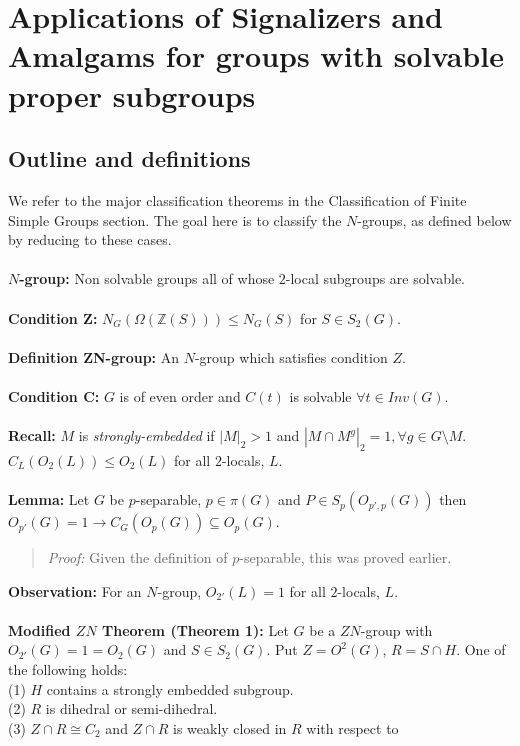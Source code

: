 \chapter{Applications of Signalizers and Amalgams for groups with solvable proper subgroups}
\section {Outline and definitions}
We refer to the major classification theorems in the Classiﬁcation of Finite Simple Groups section.  The
goal here is to classify the $N$-groups, as defined below by reducing to these cases.
\\
\\
{\bf $N$-group:}  Non solvable groups all of whose $2$-local subgroups are solvable.
\\
\\
{\bf Condition Z:}  $N_G(\Omega({\mathbb Z}(S))) \le N_G(S)$ for $S \in S_2(G)$.
\\
\\
{\bf Definition ZN-group:} An $N$-group which satisfies condition $Z$.
\\
\\
{\bf Condition {\cal C}:}  $G$ is of even order and $C(t)$ is solvable $\forall t \in Inv(G)$.
\\
\\
{\bf Recall:}  $M$ is \emph{strongly-embedded} if
$|M|_2 > 1$ and $|M \cap M^g|_2=1, \forall g \in G \setminus M$.  $C_L(O_2(L)) \le O_2(L)$ for all
$2$-locals, $L$.
\\
\\
{\bf Lemma:} Let $G$ be $p$-separable, $p \in \pi(G)$ and $P \in S_p(O_{p', p}(G))$ then
$O_{p'}(G)=1 \rightarrow C_G(O_p(G)) \subseteq O_p(G)$.
\begin{quote}
\emph{Proof:}
Given the definition of $p$-separable, this was proved earlier.
\end{quote}
{\bf Observation:} For an $N$-group, $O_{2'}(L)=1$ for all $2$-locals, $L$.
\\
\\
{\bf Modified $ZN$ Theorem (Theorem 1):}  Let $G$ be a $ZN$-group
with $O_{2'}(G)=1=O_2(G)$ and $S \in S_2(G)$.  Put
$Z= O^2(G)$, $R= S \cap H$.  One of the following holds:\\
(1) $H$ contains a strongly embedded subgroup.\\
(2) $R$ is dihedral or semi-dihedral.\\
(3) $Z \cap R \cong C_2$ and $Z \cap R$ is weakly closed in $R$ with respect to
